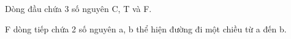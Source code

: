 Dòng đầu chứa 3 số nguyên C, T và F.  

   F dòng tiếp chứa 2 số nguyên a, b thể hiện đường đi một chiều từ a đến b.  

\